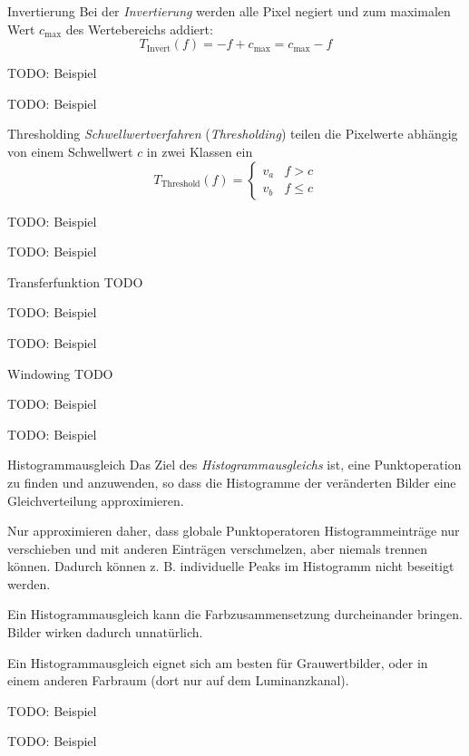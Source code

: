 \begin{defi}{Invertierung}
    Bei der \emph{Invertierung} werden alle Pixel negiert und zum maximalen Wert $c_{\max}$ des Wertebereichs addiert:
    \[
        T_{\text{Invert}}(f) = -f + c_{\max} = c_{\max} - f
    \]

    TODO: Beispiel

    TODO: Beispiel
\end{defi}

\begin{defi}{Thresholding}
    \emph{Schwellwertverfahren} (\emph{Thresholding}) teilen die Pixelwerte abhängig von einem Schwellwert $c$ in zwei Klassen ein
    \[
        T_{\text{Threshold}}(f) =
        \begin{cases}
            v_a & f > c    \\
            v_b & f \leq c
        \end{cases}
    \]

    TODO: Beispiel

    TODO: Beispiel
\end{defi}

\begin{defi}{Transferfunktion}
    TODO

    TODO: Beispiel

    TODO: Beispiel
\end{defi}

\begin{defi}{Windowing}
    TODO

    TODO: Beispiel

    TODO: Beispiel
\end{defi}

\begin{defi}{Histogrammausgleich}
    Das Ziel des \emph{Histogrammausgleichs} ist, eine Punktoperation zu finden und anzuwenden, so dass die Histogramme der veränderten Bilder eine Gleichverteilung approximieren.

    Nur approximieren daher, dass globale Punktoperatoren Histogrammeinträge nur verschieben und mit anderen Einträgen verschmelzen, aber niemals trennen können.
    Dadurch können z. B. individuelle Peaks im Histogramm nicht beseitigt werden.

    Ein Histogrammausgleich kann die Farbzusammensetzung durcheinander bringen.
    Bilder wirken dadurch unnatürlich.

    Ein Histogrammausgleich eignet sich am besten für Grauwertbilder, oder in einem anderen Farbraum (dort nur auf dem Luminanzkanal).

    TODO: Beispiel

    TODO: Beispiel
\end{defi}

